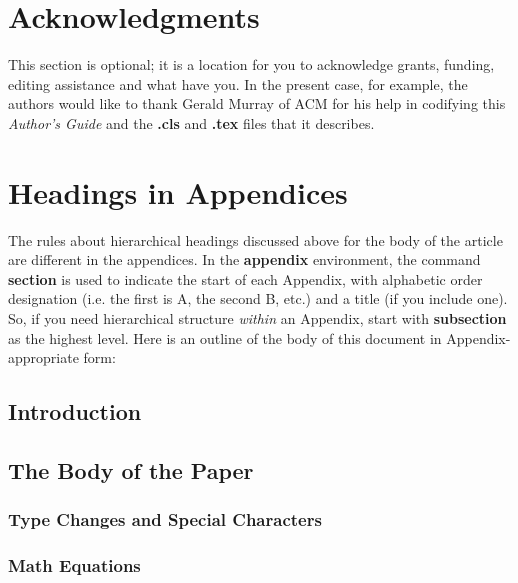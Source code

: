 \documentclass{acm_proc_article-sp}
\begin{document}
\section{Acknowledgments}
This section is optional; it is a location for you
to acknowledge grants, funding, editing assistance and
what have you.  In the present case, for example, the
authors would like to thank Gerald Murray of ACM for
his help in codifying this \textit{Author's Guide}
and the \textbf{.cls} and \textbf{.tex} files that it describes.

%


\cite{张明亮2012五子棋机器博弈系统评估函数的设计}
\cite{裴博文2008五子棋人工智能权重估值算法}
\cite{cnblogs1}
\cite{cnblogs2}
\cite{xqbase1}
\cite{xqbase2}
\cite{xqbase3}
%
%
\appendix
\section{Headings in Appendices}
The rules about hierarchical headings discussed above for
the body of the article are different in the appendices.
In the \textbf{appendix} environment, the command
\textbf{section} is used to
indicate the start of each Appendix, with alphabetic order
designation (i.e. the first is A, the second B, etc.) and
a title (if you include one).  So, if you need
hierarchical structure
\textit{within} an Appendix, start with \textbf{subsection} as the
highest level. Here is an outline of the body of this
document in Appendix-appropriate form:
\subsection{Introduction}
\subsection{The Body of the Paper}
\subsubsection{Type Changes and  Special Characters}
\subsubsection{Math Equations}
\end{document}
